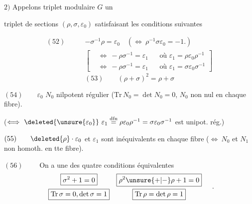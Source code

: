 $2)$ Appelons triplet modulaire  $G$ un


triplet de sections $(\rho,\sigma,\varepsilon_0)$ satisfaisant les
 conditions suivantes

\[
\begin{aligned}
(52)\qquad &-\sigma^{-1}\rho=\varepsilon_0
\quad(\Longleftrightarrow\ \rho^{-1}\sigma\varepsilon_0=-1.)\\
&\left[\begin{aligned}
&\Longleftrightarrow\ -\rho\sigma^{-1}=\varepsilon_1
&&\text{où }\varepsilon_1=\rho\varepsilon_0\rho^{-1}\\
&\Longleftrightarrow\ -\rho\sigma^{-1}=\varepsilon_1
&&\text{où }\varepsilon_1=\sigma\varepsilon_0\sigma^{-1}
\end{aligned}\right]
\end{aligned}
\]
\[
(53)\qquad(\rho+\sigma)^2=\rho+\sigma
\]

$(54)\qquad\varepsilon_0$
$N_0$  nilpotent régulier
($\mathrm{Tr}\,N_0=\det N_0=0$, $N_0$ non nul en chaque fibre).


($\Longleftrightarrow\ \deleted{\unsure{\varepsilon_0}}\ \varepsilon_1
\overset{\mathrm{dfn}}=\rho\varepsilon_0\rho^{-1}
=\sigma\varepsilon_0\sigma^{-1}$ est unipot. rég.)

$(55)\qquad\deleted{\rho}\cdot\varepsilon_0$ et $\varepsilon_1$ sont
inéquivalents en chaque fibre
($\Longleftrightarrow\ N_0$ et $N_1$ non homoth. en tte fibre).

$(56)\qquad$ On a une des quatre conditions équivalentes
\[
\begin{array}{cc}
\boxed{\sigma^2+1=0}&\boxed{\rho^2\unsure{+|-}\rho+1=0}\\[6pt]
\boxed{\mathrm{Tr}\,\sigma=0,\det\sigma=1}&
\boxed{\mathrm{Tr}\,\rho=\det\rho=1}
\end{array}
\quad.
\]

